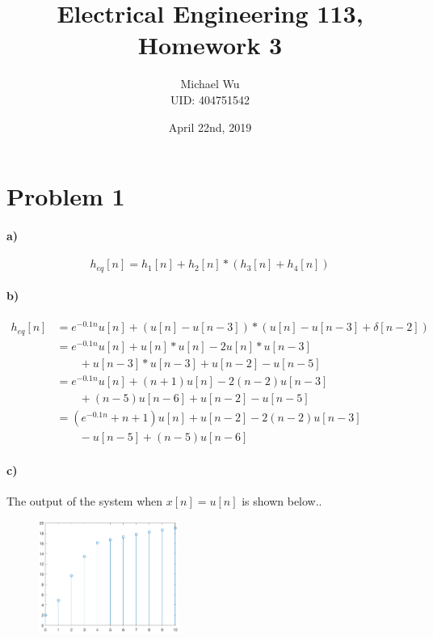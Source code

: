 \documentclass[12pt]{article}
\begin{document}
\title{Electrical Engineering 113, Homework 3}
\date{April 22nd, 2019}
\author{Michael Wu\\UID: 404751542}
\maketitle

\section*{Problem 1}

\paragraph{a)}

\[h_{eq}[n]=h_1[n]+h_2[n]*(h_3[n]+h_4[n])\]

\paragraph{b)}

\begin{align*}
    h_{eq}[n]&=e^{-0.1n}u[n] + (u[n]-u[n-3])*(u[n]-u[n-3]+\delta[n-2])\\
    &=e^{-0.1n}u[n] + u[n]*u[n] - 2u[n]*u[n-3]\\
    &\qquad+ u[n-3]*u[n-3] + u[n-2] - u[n-5]\\
    &=e^{-0.1n}u[n] + (n+1)u[n] - 2(n-2)u[n-3]\\
    &\qquad+ (n-5)u[n-6] + u[n-2] - u[n-5]\\
    &=(e^{-0.1n}+n+1)u[n] + u[n-2] - 2(n-2)u[n-3]\\
    &\qquad- u[n-5] + (n-5)u[n-6]
\end{align*}

\paragraph{c)}

The output of the system when \(x[n]=u[n]\) is shown below..

\begin{figure}[H]
    \begin{center}
        \includegraphics[width=1.8in]{problem1c.pdf}
    \end{center}
\end{figure}
\end{document}
